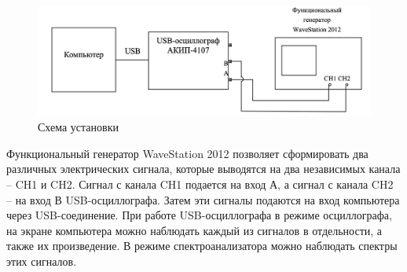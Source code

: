 \documentclass[12pt,a4paper]{article}
\begin{document}
\begin{figure}[htp]
    \centering
    \includegraphics[scale=0.3]{scheme.png}
    \caption[]{Схема установки}
\end{figure}
Функциональный генератор WaveStation 2012 позволяет сформировать два различных электрических сигнала, которые выводятся на два независимых канала – CH1 и CH2. 
Сигнал с канала CH1 подается на вход А, а сигнал с канала CH2 – на вход В USB-осциллографа. 
Затем эти сигналы подаются на вход компьютера через USB-соединение. 
При работе USB-осциллографа в режиме осциллографа, на экране компьютера можно наблюдать каждый из сигналов в отдельности, а также их произведение. 
В режиме спектроанализатора можно наблюдать спектры этих сигналов.




\end{document}
